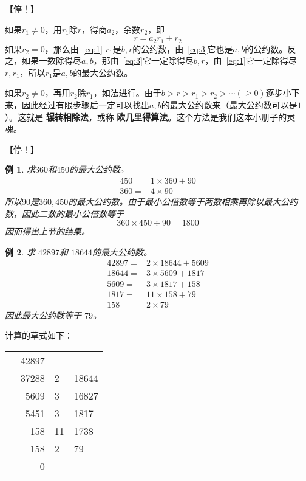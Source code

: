 \documentclass{ctexart}
\newtheorem{example}{\indent 例}[section]
\begin{document}
【停！】

如果$r_1\ne 0$，用$r_1$除$r$，得商$a_2$，余数$r_2$，即
\begin{equation}
\label{eq:2}
r = a_2r_1 + r_2
\end{equation}
如果$r_2=0$，那么由~\eqref{eq:1} $r_1$是$b,r$的公约数，由~\eqref{eq:3}它也是$a,b$的公约数。反之，如果一数除得尽$a,b$，那由~\eqref{eq:3}它一定除得尽$b,r$，由~\eqref{eq:1}它一定除得尽$r,r_1$，所以$r_1$是$a,b$的最大公约数。

如果$r_2\ne 0$，再用$r_2$除$r_1$，如法进行。由于$b>r>r_1>r_2>\cdots(\ge0)$逐步小下来，因此经过有限步骤后一定可以找出$a,b$的最大公约数来（最大公约数可以是$1$）。这就是 \textbf{辗转相除法}，或称 \textbf{欧几里得算法}。这个方法是我们这本小册子的灵魂。

【停！】

\begin{example}
  求$360$和$450$的最大公约数。
  \begin{align*}
    450 = & 1 \times 360 + 90\\
    360 = & 4 \times 90
  \end{align*}
  所以$90$是$360,450$的最大公约数。由于最小公倍数等于两数相乘再除以最大公约数，因此二数的最小公倍数等于
\begin{equation*}
360\times450\div 90 = 1800
\end{equation*}
因而得出上节的结果。
\end{example}

\begin{example}
  \label{sec:2}
  求 $42897$和 $18644$的最大公约数。
  \begin{align*}
    42897 = & 2 \times 18644 + 5609\\
    18644 = & 3 \times 5609 + 1817\\
    5609 = & 3 \times 1817 + 158\\
    1817 = & 11 \times 158 + 79\\
    158 = & 2 \times 79
  \end{align*}
因此最大公约数等于 $79$。
\end{example}

计算的草式如下：

\begin{table}[h]
 \centering
\begin{tabular}{r|l|l}
42897 &    &       \\
$-$ 37288 & 2  & 18644 \\ \cline{1-1}
5609  & 3  & 16827 \\ \cline{3-3} 
5451  & 3  & 1817  \\ \cline{1-1}
158   & 11 & 1738  \\ \cline{3-3} 
158   & 2  & 79    \\ \cline{1-1}
0     &    &      
\end{tabular}
\end{table}
\end{document}
